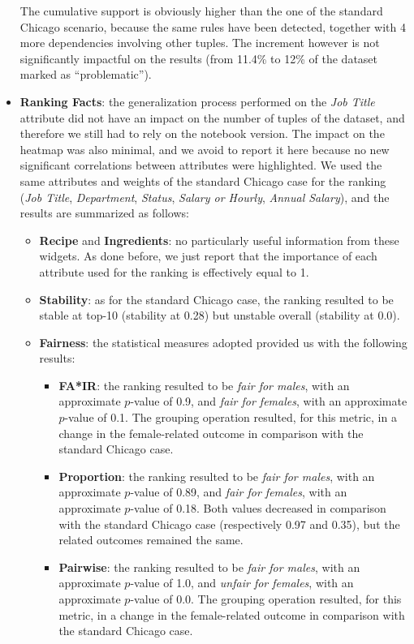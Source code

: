 \begin{itemize}
The cumulative support is obviously higher than the one of the standard Chicago scenario, because the same rules have been detected, together with 4 more dependencies involving other tuples. The increment however is not significantly impactful on the results (from 11.4\% to 12\% of the dataset marked as ``problematic'').
\item \textbf{Ranking Facts}: the generalization process performed on the \textit{Job Title} attribute did not have an impact on the number of tuples of the dataset, and therefore we still had to rely on the notebook version. The impact on the heatmap was also minimal, and we avoid to report it here because no new significant correlations between attributes were highlighted. We used the same attributes and weights of the standard Chicago case for the ranking (\textit{Job Title}, \textit{Department}, \textit{Status}, \textit{Salary or Hourly}, \textit{Annual Salary}), and the results are summarized as follows:
\begin{itemize}
\item \textbf{Recipe} and \textbf{Ingredients}: no particularly useful information from these widgets. As done before, we just report that the importance of each attribute used for the ranking is effectively equal to 1.
\item \textbf{Stability}: as for the standard Chicago case, the ranking resulted to be stable at top-10 (stability at 0.28) but unstable overall (stability at 0.0).
\item \textbf{Fairness}: the statistical measures adopted provided us with the following results:
\begin{itemize}
\item \textbf{FA*IR}: the ranking resulted to be \textit{fair for males}, with an approximate \(p\)-value of 0.9, and \textit{fair for females}, with an approximate \(p\)-value of 0.1. The grouping operation resulted, for this metric, in a change in the female-related outcome in comparison with the standard Chicago case.
\item \textbf{Proportion}: the ranking resulted to be \textit{fair for males}, with an approximate \(p\)-value of 0.89, and \textit{fair for females}, with an approximate \(p\)-value of 0.18. Both values decreased in comparison with the standard Chicago case (respectively 0.97 and 0.35), but the related outcomes remained the same.
\item \textbf{Pairwise}: the ranking resulted to be \textit{fair for males}, with an approximate \(p\)-value of 1.0, and \textit{unfair for females}, with an approximate \(p\)-value of 0.0. The grouping operation resulted, for this metric, in a change in the female-related outcome in comparison with the standard Chicago case.

\end{itemize}
\end{itemize}
\end{itemize}

